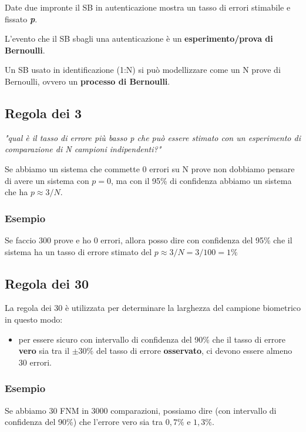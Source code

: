 \documentclass{report}
\begin{document}
\noindent Date due impronte il SB in autenticazione mostra un tasso di errori stimabile e fissato \textit{\textbf{p}}.

\noindent L'evento che il SB sbagli una autenticazione è un \textbf{esperimento/prova di Bernoulli}.

\noindent Un SB usato in identificazione (1:N) si può modellizzare come un N prove di Bernoulli, 
ovvero un \textbf{processo di Bernoulli}.

\subsection{Regola dei 3}

\textit{"qual è il tasso di errore più basso p che può essere stimato con un esperimento
di comparazione di N campioni indipendenti?"}

\noindent Se abbiamo un sistema che commette 0 errori su N prove non dobbiamo pensare di
avere un sistema con $p=0$, ma con il 95\% di confidenza abbiamo un sistema
che ha $p \approx 3/N$.

\subsubsection{Esempio}

Se faccio 300 prove e ho 0 errori, allora posso dire con confidenza del 95\% che
il sistema ha un tasso di errore stimato del $p \approx 3/N = 3/100 = 1\%$

\subsection{Regola dei 30}

La regola dei 30 è utilizzata per determinare la larghezza del campione biometrico in questo modo:
\begin{itemize}
    \item per essere sicuro con intervallo di confidenza del 90\% che il tasso di errore \textbf{vero}
    sia tra il $\pm 30 \%$ del tasso di errore \textbf{osservato}, ci devono essere almeno 30 errori.    
\end{itemize}

\subsubsection{Esempio}
Se abbiamo 30 FNM in 3000 comparazioni, possiamo dire (con intervallo di 
confidenza del 90\%) che l'errore vero sia tra $0,7\%$ e $1,3\%$.
\end{document}
